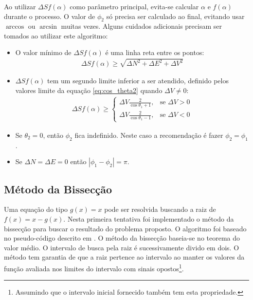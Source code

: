 \documentclass[final,3p,12pt]{elsarticle}
\begin{document}
Ao utilizar $\Delta S f(\alpha)$ como parâmetro principal, evita-se calcular $\alpha$ e $f(\alpha)$ durante o processo. O valor de $\phi_2$ só precisa ser calculado ao final, evitando usar $\arccos$ ou $\arcsin$ muitas vezes. Alguns cuidados adicionais precisam ser tomados ao utilizar este algoritmo:

\begin{itemize}
    \item O valor mínimo de $\Delta S f(\alpha)$ é uma linha reta entre os pontos:
    \begin{align*}
        \Delta S f(\alpha) \geq \sqrt{\Delta N^2 + \Delta E^2 + \Delta V^2}
    \end{align*}
    \item $\Delta S f(\alpha)$ tem um segundo limite inferior a ser atendido, definido pelos valores limite da equação \ref{eq:cos_theta2} quando $\Delta V \neq 0$:
    \begin{align*}
        \Delta S f(\alpha) \geq \begin{cases}
            \Delta V \frac{2}{\cos \theta_1+1},&\text{se } \Delta V > 0 \\
            \Delta V \frac{2}{\cos \theta_1-1},&\text{se } \Delta V < 0  
        \end{cases}
    \end{align*}
    \item Se $\theta_2 = 0$, então $\phi_2$ fica indefinido. Neste caso a recomendação é fazer $\phi_2 = \phi_1$. 
    \item Se $\Delta N = \Delta E = 0$ então $|\phi_1 - \phi_2| = \pi$.
\end{itemize}

    \subsection{Método da Bissecção}
    
    Uma equação do tipo $g(x)=x$ pode ser resolvida buscando a raiz de $f(x) = x - g(x)$. Nesta primeira tentativa foi implementado o método da bissecção para buscar o resultado do problema proposto. O algoritmo foi baseado no pseudo-código descrito em \cite{burden2016analise}. O método da bissecção baseia-se no teorema do valor médio. O intervalo de busca pela raiz é sucessivamente divido em dois. O método tem garantia de que a raiz pertence ao intervalo ao manter os valores da função avaliada nos limites do intervalo com sinais opostos\footnote{Assumindo que o intervalo inicial fornecido também tem esta propriedade.}. 
\end{document}
